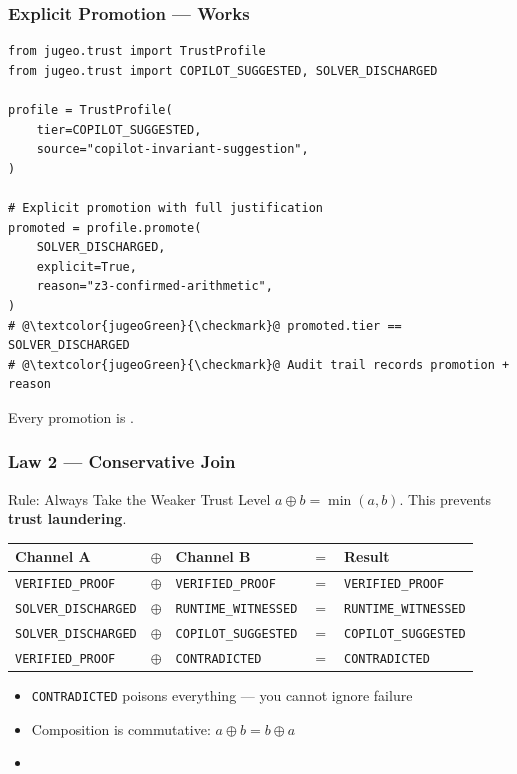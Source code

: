 \begin{frame}[fragile]
\frametitle{Explicit Promotion --- Works}
\begin{lstlisting}[escapechar=@]
from jugeo.trust import TrustProfile
from jugeo.trust import COPILOT_SUGGESTED, SOLVER_DISCHARGED

profile = TrustProfile(
    tier=COPILOT_SUGGESTED,
    source="copilot-invariant-suggestion",
)

# Explicit promotion with full justification
promoted = profile.promote(
    SOLVER_DISCHARGED,
    explicit=True,
    reason="z3-confirmed-arithmetic",
)
# @\textcolor{jugeoGreen}{\checkmark}@ promoted.tier == SOLVER_DISCHARGED
# @\textcolor{jugeoGreen}{\checkmark}@ Audit trail records promotion + reason
\end{lstlisting}
\vfill
\begin{center}
\small Every promotion is .
\end{center}
\end{frame}

\begin{frame}
\frametitle{Law 2 --- Conservative Join}
\begin{block}{Rule: Always Take the Weaker Trust Level}
$a \oplus b = \min(a, b)$. This prevents \textbf{trust laundering}.
\end{block}
\vspace{0.2cm}
\begin{center}
\small
\begin{tabular}{@{} l c l c l @{}}
  \toprule
  \textbf{Channel A} & $\oplus$ & \textbf{Channel B} & $=$ & \textbf{Result} \\
  \midrule
  \texttt{VERIFIED\_PROOF}    & $\oplus$ & \texttt{VERIFIED\_PROOF}    & $=$ & \texttt{VERIFIED\_PROOF} \\
  \texttt{SOLVER\_DISCHARGED} & $\oplus$ & \texttt{RUNTIME\_WITNESSED} & $=$ & \texttt{RUNTIME\_WITNESSED} \\
  \texttt{SOLVER\_DISCHARGED} & $\oplus$ & \texttt{COPILOT\_SUGGESTED} & $=$ & \texttt{COPILOT\_SUGGESTED} \\
  \texttt{VERIFIED\_PROOF}    & $\oplus$ & \texttt{CONTRADICTED}       & $=$ & \texttt{CONTRADICTED} \\
  \bottomrule
\end{tabular}
\end{center}
\vfill
\begin{itemize}
  \item \texttt{CONTRADICTED} poisons everything --- you cannot ignore failure
  \item Composition is commutative: $a \oplus b = b \oplus a$
  \item {}
\end{itemize}
\end{frame}

